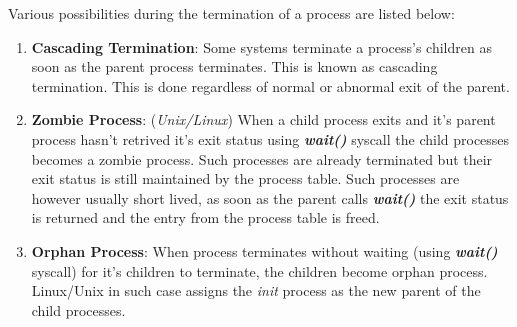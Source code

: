 \documentclass[a4,11pt]{article}
\begin{document}
Various possibilities during the termination of a process are listed
below:
\begin{enumerate}
\item \textbf{Cascading Termination}: Some systems terminate a
  process's children as soon as the parent process terminates. This is
  known as cascading termination. This is done regardless of normal or
  abnormal exit of the parent.

\item \textbf{Zombie Process}: (\textit{Unix/Linux}) When a child
  process exits and it's parent process hasn't retrived it's exit
  status using \textbf{\textit{wait()}} syscall the child processes
  becomes a zombie process. Such processes are already terminated but
  their exit status is still maintained by the process table. Such
  processes are however usually short lived, as soon as the parent
  calls \textbf{\textit{wait()}} the exit status is returned and the
  entry from the process table is freed.

\item \textbf{Orphan Process}: When process terminates without waiting
  (using \textbf{\textit{wait()}} syscall) for it's children to
  terminate, the children become orphan process. Linux/Unix in such
  case assigns the \textit{init} process as the new parent of the
  child processes.
\end{enumerate}
\end{document}
